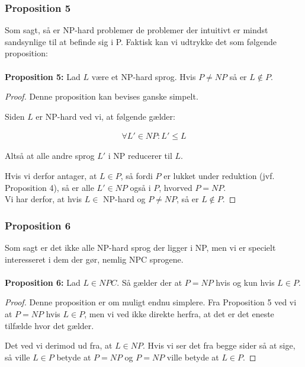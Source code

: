\subsubsection{Proposition 5}

Som sagt, så er NP-hard problemer de problemer der intuitivt er mindst sandsynlige til at befinde sig i P. Faktisk kan vi udtrykke det som følgende proposition:\\
~\\
\textbf{Proposition 5:} Lad $L$ være et NP-hard sprog. Hvis $P \neq NP$ så er $L \notin P$.

\begin{proof}
 Denne proposition kan bevises ganske simpelt. 

Siden $L$ er NP-hard ved vi, at følgende gælder:

\begin{align*}
 \forall L' \in NP : L' \leq L
\end{align*}

Altså at alle andre sprog $L'$ i NP reducerer til $L$.

Hvis vi derfor antager, at $L \in P$, så fordi $P$ er lukket under reduktion (jvf. Proposition 4), så er alle $L' \in NP$ også i $P$, hvorved $P=NP$. \\

Vi har derfor, at hvis $L \in$ NP-hard og $P \neq NP$, så er $L \notin P$.

\end{proof}


\subsubsection{Proposition 6}

Som sagt er det ikke alle NP-hard sprog der ligger i NP, men vi er specielt interesseret i dem der gør, nemlig NPC sprogene.\\
~\\
\textbf{Proposition 6:} Lad $L \in NPC$. Så gælder der at $P=NP$ hvis og kun hvis $L \in P$.

\begin{proof}
 Denne proposition er om muligt endnu simplere. Fra Proposition 5 ved vi at $P=NP$ hvis $L \in P$, men vi ved ikke direkte herfra, at det er det eneste tilfælde hvor det gælder. 

Det ved vi derimod ud fra, at $L \in NP$. Hvis vi ser det fra begge sider så at sige, så ville $L \in P$ betyde at $P=NP$ og $P=NP$ ville betyde at $L \in P$.
\end{proof}

